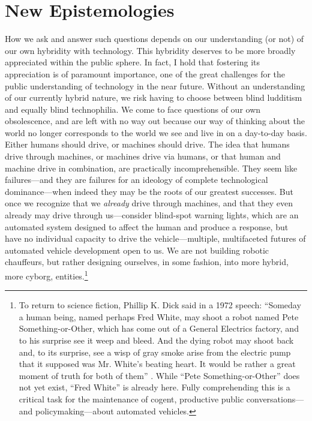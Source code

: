 \section{New Epistemologies}

How we ask and answer such questions depends on our understanding (or
not) of our own hybridity with technology. This hybridity deserves
to be more broadly appreciated within the public sphere. 
In fact, I hold that fostering its appreciation is of paramount
importance, one of the great challenges for the public understanding
of technology in the near future. Without an understanding of our
currently hybrid nature, we risk having to choose between blind ludditism
and equally blind technophilia. We come to face questions of our own
obsolescence, and are left with no way out because our way of thinking
about the world no longer corresponds to the world we see and live in
on a day-to-day basis. Either humans should drive, or machines should
drive. The idea that humans drive through machines, or machines drive
via humans, or that human and machine drive in combination, are
practically incomprehensible. They seem like failures---and they are
failures for an ideology of complete technological dominance---when
indeed they may be the roots of our greatest successes. But once we
recognize that we \emph{already} drive through machines, and that they
even already may drive through us---consider blind-spot
warning lights, which are an automated system designed to affect the
human and produce a response, but have no individual capacity to drive
the vehicle---multiple, multifaceted futures of automated vehicle
development open to us. We are not building robotic
chauffeurs, but rather designing ourselves, in some fashion, into more
hybrid, more cyborg, entities.\footnote{To return to science fiction, Phillip K. Dick said in
a 1972 speech: ``Someday a human being, named perhaps Fred White, may shoot a robot
named Pete Something-or-Other, which has come out of a General
Electrics factory, and to his surprise see it weep and bleed. And the
dying robot may shoot back and, to its surprise, see a wisp of gray
smoke arise from the electric pump that it supposed was Mr. White's
beating heart. It would be rather a great moment of truth for both of
them'' \cite{???-http://boingboing.net/2015/03/10/philip-k-dicks-androids-blu.html}.
While ``Pete Something-or-Other'' does not yet exist, ``Fred White''
is already here. Fully comprehending this is a critical task for the
maintenance of cogent, productive public conversations---and
policymaking---about automated vehicles.}

